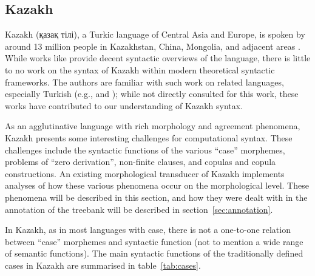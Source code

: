 \documentclass[a4paper,11pt, onecolumn,twoside]{article}
\begin{document}
\subsection{Kazakh}\label{sec:kazakh}

Kazakh (қазақ тілі), a Turkic language of Central Asia and Europe, is spoken by around 13 million people in Kazakhstan, China, Mongolia, and adjacent areas \parencite{ethnologue}.  While works like \textcite{Balaqayev54} provide decent syntactic overviews of the language, there is little to no work on the syntax of Kazakh within modern theoretical syntactic frameworks.  The authors are familiar with such work on related languages, especially Turkish (e.g., \cite{Kornfilt97} and \cite{GokselKerslake05}); while not directly consulted for this work, these works have contributed to our understanding of Kazakh syntax.

As an agglutinative language with rich morphology and agreement phenomena, Kazakh presents some interesting challenges for computational syntax.  These challenges include the syntactic functions of the various ``case'' morphemes, problems of ``zero derivation'', non-finite clauses, and copulas and copula constructions.  An existing morphological transducer of Kazakh \parencite{Washington14} implements analyses of how these various phenomena occur on the morphological level.  These phenomena will be described in this section, and how they were dealt with in the annotation of the treebank will be described in section~\ref{sec:annotation}. 

In Kazakh, as in most languages with case, there is not a one-to-one relation between ``case'' morphemes and syntactic function (not to mention a wide range of semantic functions).  The main syntactic functions of the traditionally defined cases in Kazakh are summarised in table~\ref{tab:cases}.
\end{document}
